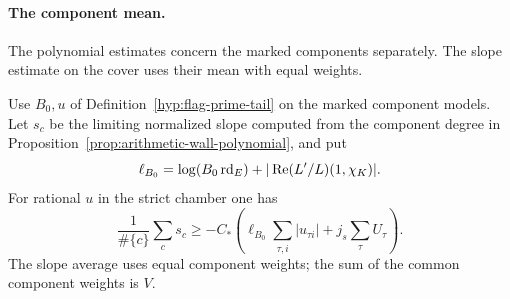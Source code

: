 \paragraph{The component mean.}

The polynomial estimates concern the marked components separately. The slope estimate on the cover uses their mean with equal weights.

\begin{proposition}\label{prop:flag-component-mean-lower}
Use \(B_0,u\) of Definition~\ref{hyp:flag-prime-tail} on the
marked component models. Let \(s_c\) be the limiting normalized
slope computed from the component degree in Proposition~\ref{prop:arithmetic-wall-polynomial}, and put
\[
 \ell_{B_0}=\log(B_0\operatorname{rd}_E)
                      +|\operatorname{Re} (L'/L)(1,\chi_K)|.
\]
For rational \(u\) in the strict chamber one has
\[
 \frac{1}{\#\{c\}}\sum_c s_c
 \ge-C_*\left(\ell_{B_0}\sum_{\tau,i}|u_{\tau i}|
                              + j_s\sum_\tau U_\tau\right).
\]
The slope average uses equal component weights; the sum of
the common component weights is \(V\).
\end{proposition}

